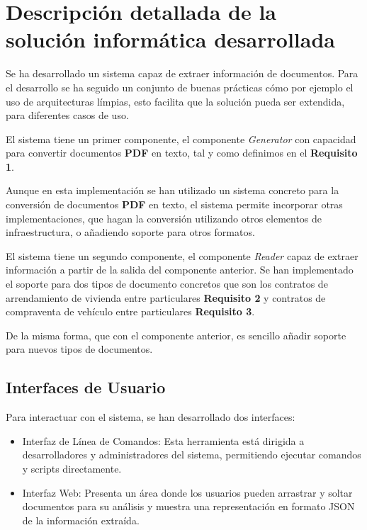 \section{Descripción detallada de la solución informática desarrollada}

Se ha desarrollado un sistema capaz de extraer información de documentos.
Para el desarrollo se ha seguido un conjunto de buenas prácticas cómo por ejemplo el uso de arquitecturas límpias,
esto facilita que la solución pueda ser extendida, para diferentes casos de uso.

El sistema tiene un primer componente, el componente \textit{Generator} con capacidad para convertir documentos
\textbf{PDF} en texto, tal y como definimos en el \textbf{Requisito 1}.

Aunque en esta implementación se han utilizado un sistema concreto para la conversión de documentos \textbf{PDF}
en texto, el sistema permite incorporar otras implementaciones, que hagan la conversión utilizando otros elementos de
infraestructura, o añadiendo soporte para otros formatos.

El sistema tiene un segundo componente, el componente \textit{Reader} capaz de extraer información a partir de la
salida del componente anterior.
Se han implementado el soporte para dos tipos de documento concretos que son los contratos de arrendamiento de vivienda
entre particulares \textbf{Requisito 2} y contratos de compraventa de vehículo entre particulares \textbf{Requisito 3}.

De la misma forma, que con el componente anterior, es sencillo añadir soporte para nuevos tipos de documentos.



\subsection*{Interfaces de Usuario}
Para interactuar con el sistema, se han desarrollado dos interfaces:

\begin{itemize}
    \item Interfaz de Línea de Comandos: Esta herramienta está dirigida a desarrolladores y
    administradores del sistema, permitiendo ejecutar comandos y scripts directamente.


    \item Interfaz Web: Presenta un área donde los usuarios pueden
    arrastrar y soltar documentos para su análisis y muestra una representación en formato JSON de la información
    extraída.
\end{itemize}



